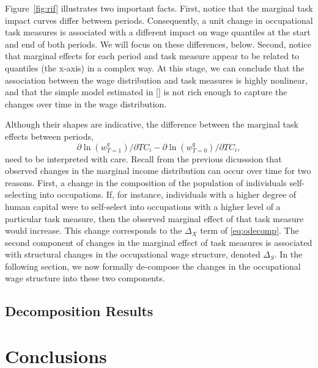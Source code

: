 Figure~\ref{fig:rif} illustrates two important facts. First, notice that the marginal task impact curves differ between periods. Consequently, a unit change in occupational task measures is associated with a different impact on wage quantiles at the start and end of both periods. We will focus on these differences, below. Second, notice that marginal effects for each period and task measure appear to be related to quantiles (the x-axis) in a complex way. At this stage, we can conclude that the association between the wage distribution and task measures is highly nonlinear, and that the simple model estimated in \eqref{} is not rich enough to capture the changes over time in the wage distribution.


Although their shapes are indicative, the difference between the marginal task effects between periods,
$$\partial\ln(w^q_{T=1})/\partial TC_i-\partial\ln(w^q_{T=0})/\partial TC_i,$$
need to be interpreted with care. Recall from the previous dicusssion that observed changes in the marginal income distribution can occur over time for two reasons. First, a change in the composition of the population of individuals self-selecting into occupations. If, for instance, individuals with a higher degree of human capital were to self-select into occupations with a higher level of a particular task measure, then the observed marginal effect of that task measure would increase. This change corresponds to the $\Delta_X$ term of \eqref{eq:odecomp}. The second component of changes in the marginal effect of task measures is associated with structural changes in the occupational wage structure, denoted $\Delta_S$. In the following section, we now formally de-compose the changes in the occupational wage structure into these two components.

\subsection{Decomposition Results}

\section{Conclusions}


